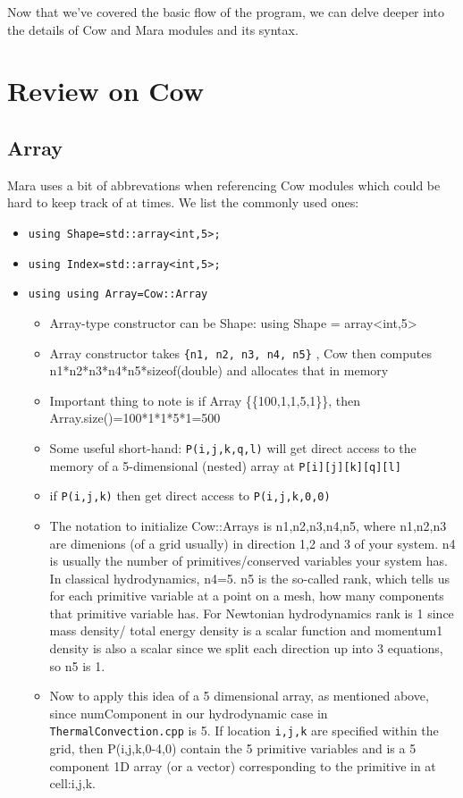 \documentclass{article}
\begin{document}
Now that we've covered the basic flow of the program, we can delve deeper into the details of Cow and Mara modules and its syntax.

\section{Review on Cow}
\subsection{Array}

Mara uses a bit of abbrevations when referencing Cow modules which could be hard to keep track of at times. We list the commonly used ones:

\begin{itemize}
	\item \texttt{using Shape=std::array<int,5>;
} 
	\item \texttt{using Index=std::array<int,5>;}
	\item \texttt{using using Array=Cow::Array}
	\begin{itemize}
		\item Array-type constructor can be Shape: using Shape = array<int,5>
		\item Array constructor takes \texttt{\{n1, n2, n3, n4, n5\}}
, Cow then computes n1*n2*n3*n4*n5*sizeof(double) and allocates that in memory 
		\item Important thing to note is if Array \{\{100,1,1,5,1\}\}, then Array.size()=100*1*1*5*1=500
		\item Some useful short-hand: \texttt{P(i,j,k,q,l)} will get direct access to the memory of a 5-dimensional (nested) array at \texttt{P[i][j][k][q][l]}
		\item if \texttt{P(i,j,k)} then get direct access to \texttt{P(i,j,k,0,0)}
		\item The notation to initialize Cow::Arrays is {{n1,n2,n3,n4,n5}}, where n1,n2,n3 are dimenions (of a grid usually) in direction 1,2 and 3 of your system. n4 is usually the number of primitives/conserved variables your system has. In classical hydrodynamics, n4=5. n5 is the so-called rank, which tells us for each primitive variable at a point on a mesh, how many components that primitive variable has. For Newtonian hydrodynamics rank is 1 since mass density/ total energy density is a scalar function and momentum1 density is also a scalar since we split each direction up into 3 equations, so n5 is 1. 
		\item Now to apply this idea of a 5 dimensional array, as mentioned above, since numComponent in our hydrodynamic case in \texttt{ThermalConvection.cpp} is 5. If location \texttt{i,j,k} are specified within the grid, then P(i,j,k,0-4,0) contain the 5 primitive variables and is a 5 component 1D array (or a vector) corresponding to the primitive in at cell:i,j,k.

\end{itemize}
\end{itemize}
\end{document}
